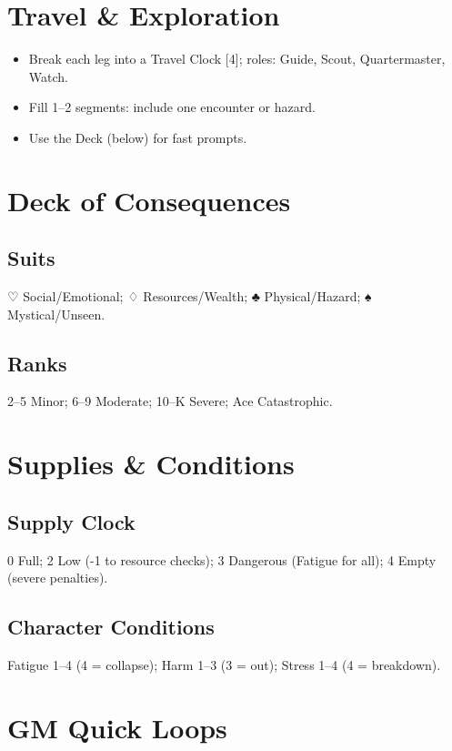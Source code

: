 \begin{multicols}{2}
\section{Travel \& Exploration}
\begin{itemize}
  \item Break each leg into a Travel Clock [4]; roles: Guide, Scout, Quartermaster, Watch.
  \item Fill 1–2 segments: include one encounter or hazard.
  \item Use the Deck (below) for fast prompts.
\end{itemize}

\section{Deck of Consequences}
\subsection*{Suits}
♡ Social/Emotional; ♢ Resources/Wealth; ♣ Physical/Hazard; ♠ Mystical/Unseen.
\subsection*{Ranks}
2–5 Minor; 6–9 Moderate; 10–K Severe; Ace Catastrophic.

\section{Supplies \& Conditions}
\subsection*{Supply Clock}
0 Full; 2 Low (-1 to resource checks); 3 Dangerous (Fatigue for all); 4 Empty (severe penalties).
\subsection*{Character Conditions}
Fatigue 1–4 (4 = collapse); Harm 1–3 (3 = out); Stress 1–4 (4 = breakdown).

\section{GM Quick Loops}

\end{multicols}
